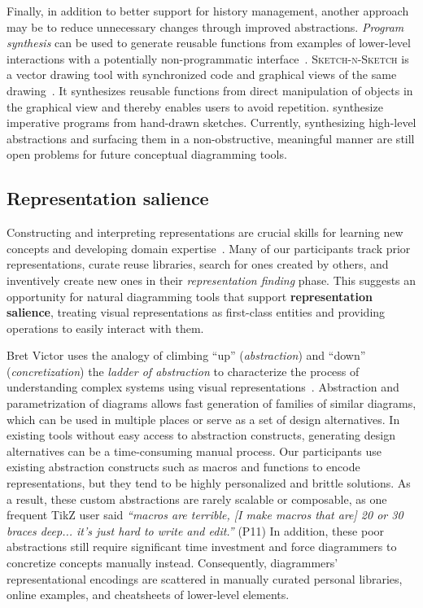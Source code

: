 Finally, in addition to better support for history management, another approach may be to reduce unnecessary changes through improved abstractions. \emph{Program synthesis} can be used to generate reusable functions from examples of lower-level interactions with a potentially non-programmatic interface~\cite{programSynthesis}. \textsc{Sketch-n-Sketch} is a vector drawing tool with synchronized code and graphical views of the same drawing~\cite{Sketch-n-Sketch}. It synthesizes reusable functions from direct manipulation of objects in the graphical view and thereby enables users to avoid repetition. \citet{Kevin-NIPS} synthesize imperative programs from hand-drawn sketches. Currently, synthesizing high-level abstractions and surfacing them in a non-obstructive, meaningful manner are still open problems for future conceptual diagramming tools.


\subsection{Representation salience}

Constructing and interpreting representations are crucial skills for learning new concepts and developing domain expertise~\cite{ainsworth_drawing_2011}. Many of our participants track prior representations, curate reuse libraries, search for ones created by others, and inventively create new ones in their \emph{representation finding} phase. This suggests an opportunity for natural diagramming tools that support \textbf{representation salience}, treating visual representations as first-class entities and providing operations to easily interact with them. 

Bret Victor uses the analogy of climbing ``up'' (\emph{abstraction}) and ``down'' (\emph{concretization}) the \emph{ladder of abstraction} to characterize the process of understanding complex systems using visual representations~\cite{ladderOfAbstraction}. Abstraction and parametrization of diagrams allows fast generation of families of similar diagrams, which can be used in multiple places or serve as a set of design alternatives. In existing tools without easy access to abstraction constructs, generating design alternatives can be a time-consuming  manual process. Our participants use existing abstraction constructs such as macros and functions to encode representations, but they tend to be highly personalized and brittle solutions. As a result, these custom abstractions are rarely scalable or composable, as one frequent TikZ user said \textit{``macros are terrible, [I make macros that are] 20 or 30 braces deep... it's just hard to write and edit.''} (P11) In addition, these poor abstractions still require significant time investment and force diagrammers to concretize concepts manually instead. Consequently, diagrammers' representational encodings are scattered in manually curated personal libraries, online examples, and cheatsheets of lower-level elements.

